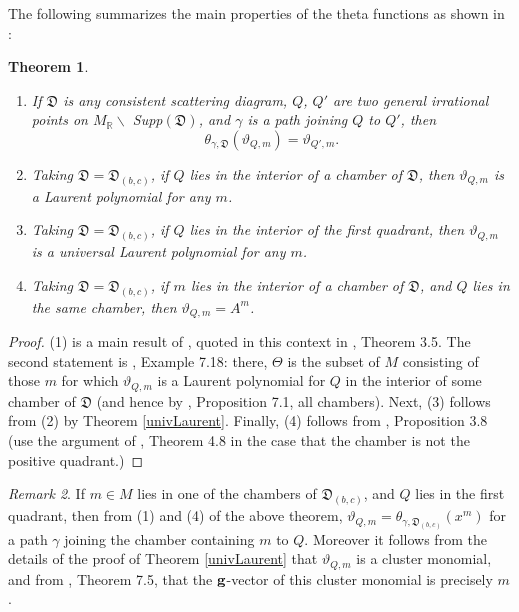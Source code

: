 \documentclass[10pt]{amsart}
\newtheorem{theorem}{Theorem}[section]
\theoremstyle{remark}
\newtheorem{remark}[theorem]{Remark}
\numberwithin{equation}{section}
\newcommand{\RR}{\mathbb{R}}
\newcommand{\fD}{\mathfrak{D}}
\begin{document}
The following summarizes the main properties of the theta functions as shown in
\cite{GHKK}:
\begin{theorem} $ $
  \begin{enumerate}
    \item
      If $\fD$ is any consistent scattering diagram, $Q$, $Q'$ are two general
      irrational points on $M_{\RR} \backslash$ Supp$(\fD)$, and $\gamma$ is a
      path joining $Q$ to $Q'$, then 
      \[
        \theta_{\gamma, \fD }(\vartheta_{Q,m}) = \vartheta_{Q', m}. 
      \]
    
    \item 
      Taking $\fD=\fD_{(b,c)}$, if $Q$ lies in the interior of a chamber of
      $\fD$, then $\vartheta_{Q,m}$ is a Laurent polynomial for any $m$.
    
    \item 
      Taking $\fD=\fD_{(b,c)}$, if $Q$ lies in the interior of the first
      quadrant, then $\vartheta_{Q,m}$ is a universal Laurent polynomial for
      any $m$.

    \item 
      Taking $\fD=\fD_{(b,c)}$, if $m$ lies in the interior of a chamber of
      $\fD$, and $Q$ lies in the same chamber, then $\vartheta_{Q,m}=A^{m}$.
   
  \end{enumerate}
\end{theorem}

\begin{proof}
  (1) is a main result of \cite{CPS}, quoted in this context in \cite{GHKK},
  Theorem 3.5.  The second statement is \cite{GHKK}, Example 7.18: there,
  $\Theta$ is the subset of $M$ consisting of those $m$ for which
  $\vartheta_{Q,m}$ is a Laurent polynomial for $Q$ in the interior of 
  some chamber of $\fD$ (and hence by \cite{GHKK}, Proposition 7.1, all 
  chambers).
  Next, (3) follows from (2) by Theorem \ref{univLaurent}. 
  Finally, (4) follows from \cite{GHKK}, Proposition 3.8 (use the argument of
  \cite{GHKK}, Theorem 4.8 in the case that the chamber is not the positive
  quadrant.)
\end{proof}

\begin{remark} 
  \label{rk:theta functions g-vector}
  If $m\in M$ lies in one of the chambers of $\fD_{(b,c)}$, and $Q$ lies in
  the first quadrant, then from (1) and (4) of the above theorem,
  $\vartheta_{Q,m}=\theta_{\gamma,\fD_{(b,c)}}(x^{m})$ for a path $\gamma$
  joining the chamber containing $m$ to $Q$. Moreover it follows from the
  details of the proof of Theorem \ref{univLaurent} that $\vartheta_{Q,m}$ is
  a cluster monomial, and from \cite{GHKK}, Theorem 7.5, that the 
  ${\bf g}$-vector of this cluster monomial is precisely $m$. 
\end{remark}
\end{document}
